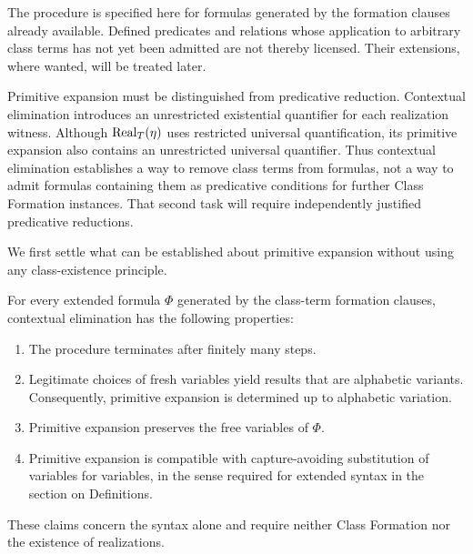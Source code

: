 The procedure is specified here for formulas generated by the
formation clauses already available. Defined predicates and relations
whose application to arbitrary class terms has not yet been admitted
are not thereby licensed. Their extensions, where wanted, will be
treated later.

Primitive expansion must be distinguished from predicative reduction.
Contextual elimination introduces an unrestricted existential
quantifier for each realization witness. Although \(\operatorname{Real}_T(\eta)\)
uses restricted universal quantification, its primitive expansion
also contains an unrestricted universal quantifier. Thus contextual
elimination establishes a way to remove class terms from formulas,
not a way to admit formulas containing them as predicative conditions
for further Class Formation instances. That second task will require
independently justified predicative reductions.


We first settle what can be established about primitive expansion
without using any class-existence principle.

\begin{metatheorem}
\label{meta:syntactic-contextual-elimination}
For every extended formula \(\Phi\) generated by the class-term
formation clauses, contextual elimination has the following
properties:
\begin{enumerate}
\item The procedure terminates after finitely many steps.
\item Legitimate choices of fresh variables yield results that are
alphabetic variants. Consequently, primitive expansion is determined
up to alphabetic variation.
\item Primitive expansion preserves the free variables of \(\Phi\).
\item Primitive expansion is compatible with capture-avoiding
substitution of variables for variables, in the sense required for
extended syntax in the section on Definitions.
\end{enumerate}
These claims concern the syntax alone and require neither Class
Formation nor the existence of realizations.
\end{metatheorem}


